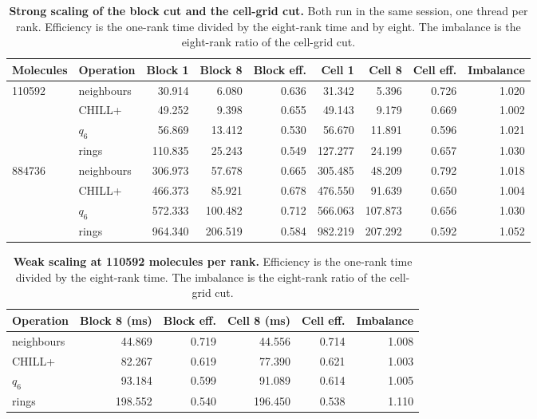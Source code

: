 \begin{table}[tbp]
\centering
\caption{\textbf{Strong scaling of the block cut and the cell-grid cut.}
Both run in the same session, one thread per rank.
Efficiency is the one-rank time divided by the eight-rank time and by eight.
The imbalance is the eight-rank ratio of the cell-grid cut.}
\label{tab:partition-strong}
\begin{tabular}{llrrrrrrr}
\toprule
Molecules & Operation & Block 1 & Block 8 & Block eff. & Cell 1 & Cell 8 & Cell eff. & Imbalance \\
\midrule
110592 & neighbours & 30.914 & 6.080 & 0.636 & 31.342 & 5.396 & 0.726 & 1.020 \\
 & CHILL+ & 49.252 & 9.398 & 0.655 & 49.143 & 9.179 & 0.669 & 1.002 \\
 & $q_6$ & 56.869 & 13.412 & 0.530 & 56.670 & 11.891 & 0.596 & 1.021 \\
 & rings & 110.835 & 25.243 & 0.549 & 127.277 & 24.199 & 0.657 & 1.030 \\
884736 & neighbours & 306.973 & 57.678 & 0.665 & 305.485 & 48.209 & 0.792 & 1.018 \\
 & CHILL+ & 466.373 & 85.921 & 0.678 & 476.550 & 91.639 & 0.650 & 1.004 \\
 & $q_6$ & 572.333 & 100.482 & 0.712 & 566.063 & 107.873 & 0.656 & 1.030 \\
 & rings & 964.340 & 206.519 & 0.584 & 982.219 & 207.292 & 0.592 & 1.052 \\
\bottomrule
\end{tabular}
\end{table}

\begin{table}[tbp]
\centering
\caption{\textbf{Weak scaling at 110592 molecules per rank.}
Efficiency is the one-rank time divided by the eight-rank time.
The imbalance is the eight-rank ratio of the cell-grid cut.}
\label{tab:partition-weak}
\begin{tabular}{lrrrrr}
\toprule
Operation & Block 8 (ms) & Block eff. & Cell 8 (ms) & Cell eff. & Imbalance \\
\midrule
neighbours & 44.869 & 0.719 & 44.556 & 0.714 & 1.008 \\
CHILL+ & 82.267 & 0.619 & 77.390 & 0.621 & 1.003 \\
$q_6$ & 93.184 & 0.599 & 91.089 & 0.614 & 1.005 \\
rings & 198.552 & 0.540 & 196.450 & 0.538 & 1.110 \\
\bottomrule
\end{tabular}
\end{table}
